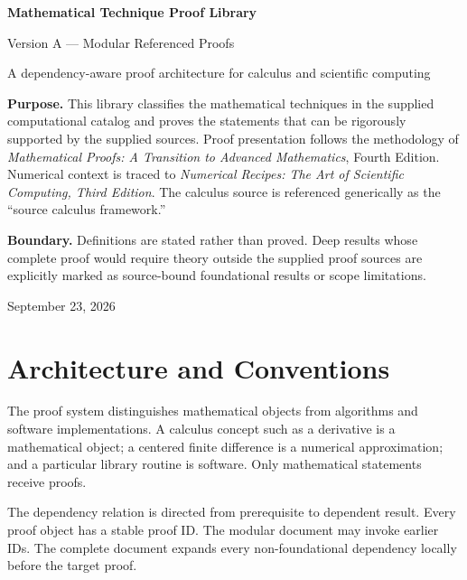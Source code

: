 \documentclass[10pt]{article}
\newcommand{\nr}{\emph{Numerical Recipes: The Art of Scientific Computing, Third Edition}}
\theoremstyle{definition}
\theoremstyle{remark}
\begin{document}
\hypersetup{pageanchor=false}

\begin{titlepage}
\centering
\vspace*{1.1in}
{\Huge\bfseries\color{navy} Mathematical Technique Proof Library\par}
\vspace{0.25in}
{\Large\color{blue} Version A --- Modular Referenced Proofs\par}
\vspace{0.5in}
{\large A dependency-aware proof architecture for calculus and scientific computing\par}
\vfill
\begin{minipage}{0.84\textwidth}
\small
\textbf{Purpose.} This library classifies the mathematical techniques in the supplied
computational catalog and proves the statements that can be rigorously supported by the
supplied sources. Proof presentation follows the methodology of
\emph{Mathematical Proofs: A Transition to Advanced Mathematics}, Fourth Edition.
Numerical context is traced to \nr. The calculus source is referenced generically as the
``source calculus framework.''

\medskip
\textbf{Boundary.} Definitions are stated rather than proved. Deep results whose complete
proof would require theory outside the supplied proof sources are explicitly marked as
source-bound foundational results or scope limitations.
\end{minipage}
\vfill
{\large September 23, 2026\par}
\end{titlepage}

\clearpage
\hypersetup{pageanchor=true}
\tableofcontents
\clearpage
{}

\section{Architecture and Conventions}

The proof system distinguishes mathematical objects from algorithms and software implementations.
A calculus concept such as a derivative is a mathematical object; a centered finite difference is a
numerical approximation; and a particular library routine is software. Only mathematical statements
receive proofs.

The dependency relation is directed from prerequisite to dependent result. Every proof object has a
stable proof ID. The modular document may invoke earlier IDs. The complete document expands every
non-foundational dependency locally before the target proof.
\end{document}
